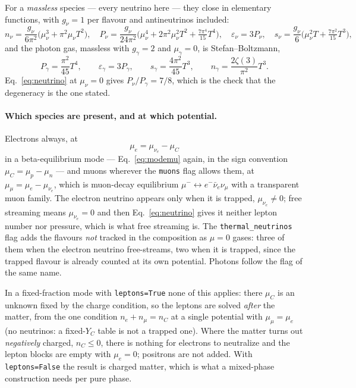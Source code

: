 \documentclass[aps,prc,onecolumn,superscriptaddress,nofootinbib,10pt]{revtex4-2}
\newcommand{\nC}{n_C}
\newcommand{\muC}{\mu_C}
\newcommand{\munue}{\mu_{\nu_e}}
\begin{document}
For a \emph{massless} species --- every neutrino here --- they close in
elementary functions, with $g_\nu = 1$ per flavour and antineutrinos included:
\begin{equation}
  n_\nu = \frac{g_\nu}{6\pi^2}\big(\mu_\nu^3 + \pi^2 \mu_\nu T^2\big) ,
  \quad
  P_\nu = \frac{g_\nu}{24\pi^2}\Big(\mu_\nu^4 + 2\pi^2\mu_\nu^2 T^2
          + \tfrac{7\pi^4}{15}T^4\Big) ,
  \quad
  \varepsilon_\nu = 3 P_\nu ,
  \quad
  s_\nu = \frac{g_\nu}{6}\Big(\mu_\nu^2 T + \tfrac{7\pi^2}{15}T^3\Big) ,
  \label{eq:neutrino}
\end{equation}
and the photon gas, massless with $g_\gamma = 2$ and $\mu_\gamma = 0$, is
Stefan--Boltzmann,
\begin{equation}
  P_\gamma = \frac{\pi^2}{45}T^4 , \qquad
  \varepsilon_\gamma = 3 P_\gamma , \qquad
  s_\gamma = \frac{4\pi^2}{45}T^3 , \qquad
  n_\gamma = \frac{2\zeta(3)}{\pi^2}T^3 .
  \label{eq:photon}
\end{equation}
Eq.~\eqref{eq:neutrino} at $\mu_\nu = 0$ gives $P_\nu/P_\gamma = 7/8$, which is
the check that the degeneracy is the one stated.

\paragraph{Which species are present, and at which potential.} Electrons
always, at
\begin{equation}
  \mu_e = \munue - \muC
  \label{eq:mue}
\end{equation}
in a beta-equilibrium mode --- Eq.~\eqref{eq:modemu} again, in the sign
convention $\muC = \mu_p - \mu_n$ --- and muons wherever the \texttt{muons}
flag allows them, at $\mu_\mu = \mu_e - \munue$, which is muon-decay
equilibrium $\mu^- \leftrightarrow e^- \bar\nu_e \nu_\mu$ with a transparent
muon family. The electron neutrino appears only when it is trapped,
$\munue \neq 0$; free streaming means $\munue = 0$ and then Eq.~\eqref{eq:neutrino}
gives it neither lepton number nor pressure, which is what free streaming is.
The \texttt{thermal\_neutrinos} flag adds the flavours \emph{not} tracked in
the composition as $\mu = 0$ gases: three of them when the electron neutrino
free-streams, two when it is trapped, since the trapped flavour is already
counted at its own potential. Photons follow the flag of the same name.

In a fixed-fraction mode with \texttt{leptons=True} none of this applies: there
$\muC$ is an unknown fixed by the charge condition, so the leptons are solved
\emph{after} the matter, from the one condition
$n_e + n_\mu = \nC$ at a single potential with $\mu_\mu = \mu_e$ (no neutrinos:
a fixed-$Y_C$ table is not a trapped one). Where the matter turns out
\emph{negatively} charged, $\nC \le 0$, there is nothing for electrons to
neutralize and the lepton blocks are empty with $\mu_e = 0$; positrons are not
added. With \texttt{leptons=False} the result is charged matter, which is what
a mixed-phase construction needs per pure phase.
\end{document}
